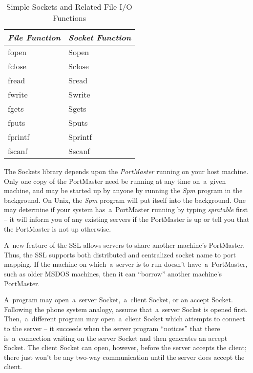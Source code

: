 \documentclass[12pt]{article}
\def\SSL{{\small SSL}}
\begin{document}
\begin{table}[thb]
  \begin{center}
  \caption{Simple Sockets and Related File {\protect\small I/O} Functions}
  \label{reminiscent}
  \begin{tabular}{||l|l||}                        \hline\hline
  {\em File Function} & {\em Socket Function}     \\ \hline
  fopen               & Sopen                     \\ 
  fclose              & Sclose                    \\ 
  fread               & Sread                     \\
  fwrite              & Swrite                    \\
  fgets               & Sgets                     \\
  fputs               & Sputs                     \\
  fprintf             & Sprintf                   \\
  fscanf              & Sscanf                    \\ \hline\hline
  \end{tabular}
  \end{center}
\end{table}

The Sockets library depends upon the {\em PortMaster} running on your host
machine. Only one copy of the PortMaster need be running at any time on~a~given
machine, and may be started up by anyone by running the {\em Spm} program in
the background.  On Unix, the {\em Spm} program will put itself into the
background.  One may determine if your system has~a~PortMaster running by
typing {\em spmtable} first -- it will inform you of any existing servers if
the PortMaster is up or tell you that the PortMaster is not up otherwise.

A~new feature of the {\SSL} allows servers to share another machine's PortMaster.
Thus, the {\SSL} supports both distributed and centralized socket name to port
mapping.  If the machine on which~a~server is to run doesn't have~a~PortMaster,
such as older {\small MSDOS} machines, then it can ``borrow'' another machine's
PortMaster.

A~program may open~a~server Socket,~a~client Socket, or an accept Socket.
Following the phone system analogy, assume that~a~server Socket is opened
first.  Then,~a~different program may open~a~client Socket which attempts to
connect to the server -- it succeeds when the server program ``notices'' that
there is~a~connection waiting on the server Socket and then generates an accept
Socket.  The client Socket can open, however, before the server accepts the
client; there just won't be any two-way communication until the server does
accept the client.
\end{document}
